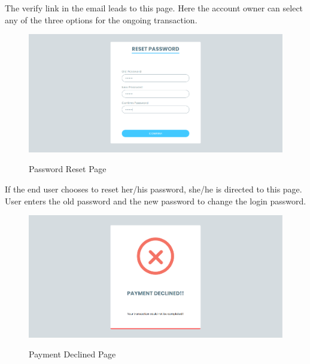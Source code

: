 \documentclass[12pt, oneside, a4paper]{article}
\begin{document}
The verify link in the email leads to this page. Here the account owner can select any of the three options for the ongoing transaction.

\vspace{0.7cm}

\begin{figure}[H]
\begin{center}
\includegraphics[width=1\textwidth]{Reset.png}\\
\caption{Password Reset Page}
\label{fig:Figure 12}
\end{center}
\end{figure}

If the end user chooses to reset her/his password, she/he is directed to this page. User enters the old password and the new password to change the login password.

\pagebreak

\begin{figure}[H]
\begin{center}
\includegraphics[width=1\textwidth]{Declined.png}\\
\caption{Payment Declined Page}
\label{fig:Figure 13}
\end{center}
\end{figure}
\end{document}
